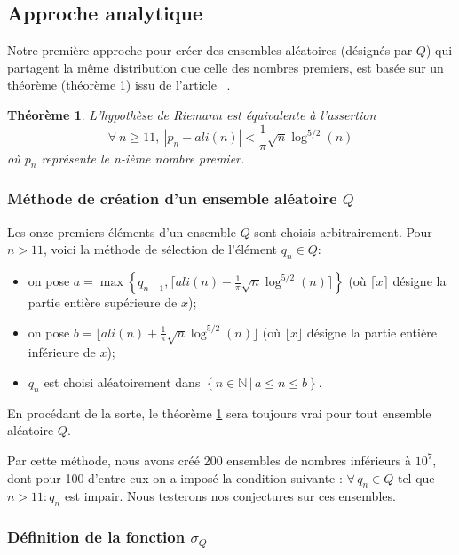 \documentclass[../main.tex]{report}
\begin{document}
\theoremstyle{plain}
\newtheorem{Thm}{Théorème}

\subsection{Approche analytique}

Notre première approche pour créer des ensembles aléatoires (désignés par $Q$) qui partagent la même distribution que celle des nombres premiers, est basée sur un théorème (théorème \ref{theorem}) issu de l'article~\cite{article_prof} . 

\begin{Thm}
\label{theorem}
	L'hypothèse de Riemann est équivalente à l'assertion 
	\[
	\forall \ n \geqslant 11, \ |p_{n} - ali(n) | < \frac{1}{\pi} \sqrt{n} \log^{5/2}(n) 
	\]
	où $p_{n}$ représente le n-ième nombre premier.
\end{Thm}

\subsubsection{Méthode de création d'un ensemble aléatoire $Q$}

Les onze premiers éléments d'un ensemble $Q$ sont choisis arbitrairement. 
Pour $ n > 11 $, voici la méthode de sélection  de l'élément $q_{n} \in Q$: 
\begin{itemize}
	\item on pose $ a = \max \left\{ q_{n-1} ,\lceil{ali(n) - \frac{1}{\pi} \sqrt{n} \log^{5/2}(n) \rceil} \right\}$ 
	(où $\lceil x \rceil$ désigne la partie entière supérieure de $x$);
	\item on pose $ b = \lfloor ali(n) + \frac{1}{\pi} \sqrt{n} \log^{5/2}(n) \rfloor $
	(où $\lfloor x \rfloor$ désigne la partie entière inférieure de $x$);
	\item $ q_{n} $ est choisi aléatoirement dans $ \left\{ n\in \mathbb{N} \, | \, a \leqslant n \leqslant b \right\}$. 
\end{itemize}

En procédant de la sorte, le théorème \ref{theorem} sera toujours vrai pour tout ensemble aléatoire $Q$.

Par cette méthode, nous avons créé 200 ensembles de nombres inférieurs à $10^{7}$, dont pour 100 d'entre-eux on a imposé la condition suivante : $\forall \, q_{n} \in Q$ tel que  $n > 11 : q_{n}$ est impair. Nous testerons nos conjectures sur ces ensembles.

\subsubsection{Définition de la fonction $\sigma_{Q}$}
\end{document}
